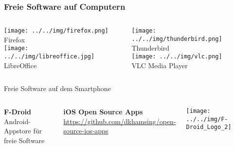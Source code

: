 \begin{frame}
  \frametitle{Freie Software auf Computern}
    \begin{columns}
        \begin{column}{5cm}
            \begin{center}
                \texttt{[image: ../../img/firefox.png]} \\
                Firefox \\
                \vspace{0.1\textheight}
                \texttt{[image: ../../img/libreoffice.jpg]}\\
                LibreOffice
            \end{center}
        \end{column}
        \begin{column}{5cm}
            \begin{center}
                \texttt{[image: ../../img/thunderbird.png]} \\
                Thunderbird \\
                \vspace{0.1\textheight}
                \texttt{[image: ../../img/vlc.png]}\\
                VLC Media Player
            \end{center}
        \end{column}
    \end{columns}
\end{frame}

\begin{frame}{Freie Software auf dem Smartphone}
  \begin{columns}
    \column{6.5cm}

    \textbf{F-Droid}\\
    Android-Appstore für freie Software

    \vspace{0.5cm}

    \textbf{iOS Open Source Apps}\\
    \url{https://github.com/dkhamsing/open-source-ios-apps}

    \column{5cm}

    \begin{center}
      \texttt{[image: ../../img/F-Droid\_Logo\_2]}
    \par\end{center}
    \begin{center}
    \par\end{center}
  \end{columns}
\end{frame}
